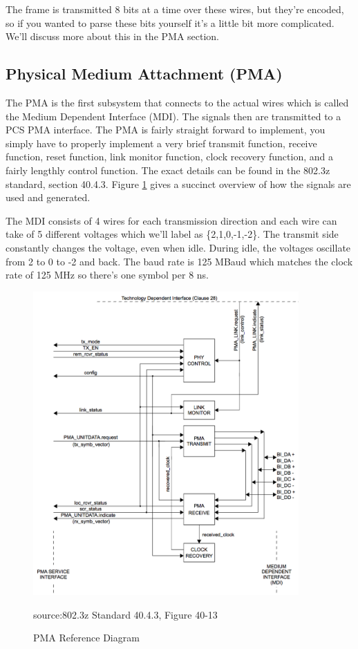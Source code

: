 \documentclass[12pt]{report}
\begin{document}
The frame is transmitted 8 bits at a time over these wires, but they're encoded,
so if you wanted to parse these bits yourself it's a little bit more complicated.
We'll discuss more about this in the PMA section.

\subsection{Physical Medium Attachment (PMA)}
The PMA is the first subsystem that connects to the actual wires which is called the Medium Dependent Interface (MDI). The signals then are transmitted to a PCS PMA interface.
The PMA is fairly straight forward to implement, you simply have to properly implement a very brief transmit function, receive function, reset function, link monitor function, clock recovery function, and a fairly lengthly control function. The exact details can be found in the 802.3z standard, section 40.4.3. Figure \ref{fig:pma} gives a succinct overview of how the signals are used and generated.


The MDI consists of 4 wires for each transmission direction and each wire can take of 5
different voltages which we'll label as \{2,1,0,-1,-2\}.
The transmit side constantly changes the voltage, even when idle.
During idle, the voltages oscillate from 2 to 0 to -2 and back.
The baud rate is 125 MBaud which matches the clock rate of 125 MHz so there's one symbol per 8 ns.

\begin{figure}[H]
\centering
\includegraphics[width=4in]{pma}
\caption{PMA Reference Diagram}
\small source:802.3z Standard 40.4.3, Figure 40-13 \cite{802.3z}
\label{fig:pma}
\end{figure}
\end{document}
